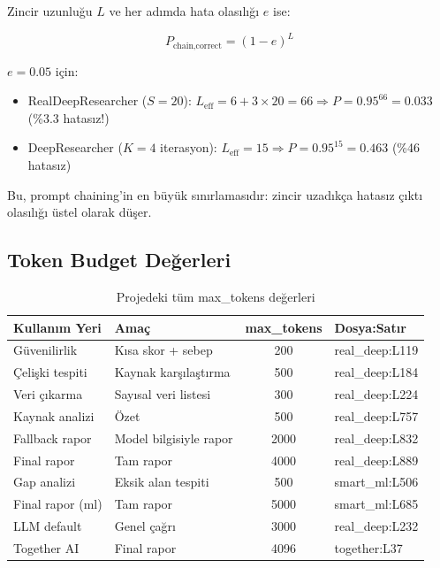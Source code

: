 Zincir uzunlu\u{g}u $L$ ve her ad{\i}mda hata olas{\i}l{\i}\u{g}{\i} $e$ ise:

\begin{equation}
\label{eq:chain_error}
P_{\text{chain,correct}} = (1 - e)^{L}
\end{equation}

\begin{ornek}
$e = 0.05$ i\c{c}in:
\begin{itemize}
  \item RealDeepResearcher ($S=20$): $L_{\text{eff}} = 6 + 3 \times 20 = 66 \Rightarrow P = 0.95^{66} = 0.033$ (\%3.3 hatas{\i}z!)
  \item DeepResearcher ($K=4$ iterasyon): $L_{\text{eff}} = 15 \Rightarrow P = 0.95^{15} = 0.463$ (\%46 hatas{\i}z)
\end{itemize}
\end{ornek}

Bu, prompt chaining'in en b\"{u}y\"{u}k s{\i}n{\i}rlamas{\i}d{\i}r: zincir uzad{\i}k\c{c}a hatas{\i}z \c{c}{\i}kt{\i} olas{\i}l{\i}\u{g}{\i} \"{u}stel olarak d\"{u}\c{s}er.

\subsection{Token Budget De\u{g}erleri}

\begin{table}[H]
\centering
\caption{Projedeki t\"{u}m max\_tokens de\u{g}erleri}
\label{tab:token_budget}
\begin{tabularx}{\textwidth}{lXcl}
\toprule
\color{chapterBlue}\textbf{Kullan{\i}m Yeri} & \color{chapterBlue}\textbf{Ama\c{c}} & \color{chapterBlue}\textbf{max\_tokens} & \color{chapterBlue}\textbf{Dosya:Sat{\i}r} \\
\midrule
G\"{u}venilirlik       & K{\i}sa skor + sebep          & 200   & real\_deep:L119 \\
\c{C}eli\c{s}ki tespiti   & Kaynak kar\c{s}{\i}la\c{s}t{\i}rma    & 500   & real\_deep:L184 \\
Veri \c{c}{\i}karma       & Say{\i}sal veri listesi       & 300   & real\_deep:L224 \\
Kaynak analizi     & \"{O}zet                     & 500   & real\_deep:L757 \\
Fallback rapor     & Model bilgisiyle rapor     & 2000  & real\_deep:L832 \\
Final rapor        & Tam rapor                  & 4000  & real\_deep:L889 \\
Gap analizi        & Eksik alan tespiti         & 500   & smart\_ml:L506  \\
Final rapor (ml)   & Tam rapor                  & 5000  & smart\_ml:L685  \\
LLM default        & Genel \c{c}a\u{g}r{\i}              & 3000  & real\_deep:L232 \\
Together AI        & Final rapor                & 4096  & together:L37   \\
\bottomrule
\end{tabularx}
\end{table}

